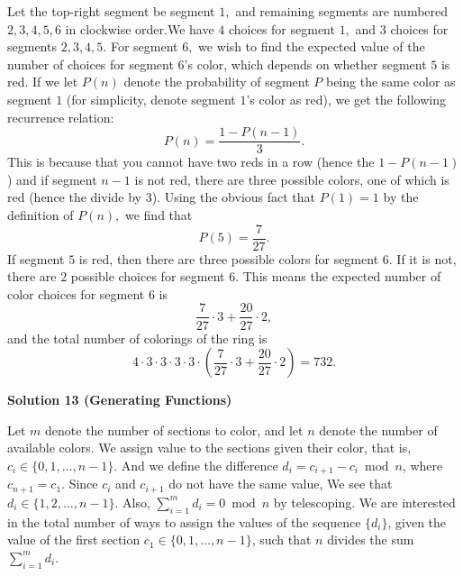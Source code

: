\begin{enumerate}
Let the top-right segment be segment $1,$ and remaining segments are numbered $2,3,4,5,6$ in clockwise order.We have $4$ choices for segment $1,$ and $3$ choices for segments $2,3,4,5.$ For segment $6,$ we wish to find the expected value of the number of choices for segment $6$'s color, which depends on whether segment $5$ is red. If we let $P(n)$ denote the probability of segment $P$ being the same color as segment $1$ (for simplicity, denote segment $1$'s color as red), we get the following recurrence relation:
 \[P(n)=\dfrac{1-P(n-1)}{3}.\]This is because that you cannot have two reds in a row (hence the $1-P(n-1)$) and if segment $n-1$ is not red, there are three possible colors, one of which is red (hence the divide by $3$). Using the obvious fact that $P(1)=1$ by the definition of $P(n),$ we find that
 \[P(5)=\dfrac{7}{27}.\]If segment $5$ is red, then there are three possible colors for segment $6.$ If it is not, there are $2$ possible choices for segment  $6.$ This means the expected number of color choices for segment $6$ is
 \[\dfrac{7}{27}\cdot3+\dfrac{20}{27}\cdot2,\]and the total number of colorings of the ring is 
 \[4\cdot3\cdot3\cdot3\cdot3\cdot\left(\dfrac{7}{27}\cdot3+\dfrac{20}{27}\cdot2\right)=\boxed{732}.\]




\textbf{Solution 13 (Generating Functions)}

Let $m$ denote the number of sections to color, and let $n$ denote the number of available colors. We assign value to the sections given their color, that is, $c_i\in\{0,1,\ldots, n-1\}$. And we define the difference $d_i=c_{i+1}-c_i\bmod{n}$, where $c_{n+1}=c_1$. Since $c_i$ and $c_{i+1}$ do not have the same value, We see that $d_i\in\{1,2,\ldots, n-1\}$. Also, $\sum_{i=1}^{m}d_i=0\bmod{n}$ by telescoping. We are interested in the total number of ways to assign the values of the sequence $\{d_i\}$, given the value of the first section $c_1\in\{0,1,\ldots, n-1\}$, such that $n$ divides the sum $\sum_{i=1}^{m}d_i$.


\end{enumerate}

